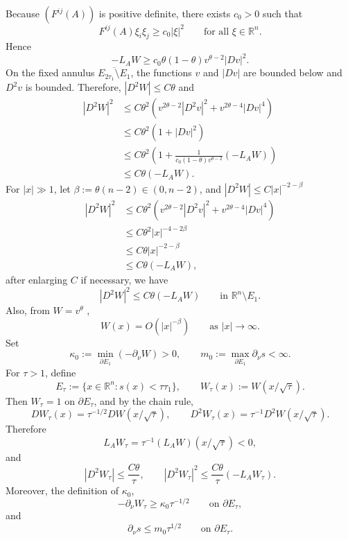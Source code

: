 \documentclass[reqno,a4paper]{amsart}
\numberwithin{equation}{section}
\begin{document}
	Because $(F^{ij}(A))$ is positive definite, there exists $c_0 > 0$ such that
	\[
	F^{ij}(A)\xi_i\xi_j \ge c_0|\xi|^2 \qquad \text{for all } \xi \in \mathbb{R}^n.
	\]
	Hence
	\begin{equation}
		-L_A W \ge c_0 \theta(1-\theta) v^{\theta-2} |Dv|^2. 
	\end{equation}
	On the fixed annulus $\overline{E_{2\tau_1}\setminus E_1}$, the functions $v$ and $|Dv|$ are bounded below and $D^2 v$ is bounded. Therefore, $|D^2 W| \le C\theta$ and 
	\begin{align*}
		|D^2W|^2 
		&\le C\theta^2\left( v^{2\theta-2}|D^2v|^2 + v^{2\theta-4}|Dv|^4 \right) \\
		&\le C\theta^2(1 + |Dv|^2)  \\
		&\le C\theta^2\left(1 + \frac{1}{c_0(1-\theta)v^{\theta-2}}(-L_AW)\right) \\
		&\le C\theta(-L_AW) . 
	\end{align*}
	For $|x| \gg 1$, let $\beta := \theta(n-2) \in (0, n-2)$, and $|D^2 W| \le C |x|^{-2-\beta}$
	\begin{align*}
		|D^2W|^2 
		&\le C\theta^2\left( v^{2\theta-2}|D^2v|^2 + v^{2\theta-4}|Dv|^4 \right)\\
		&\le C\theta^2 |x|^{-4-2\beta} \\
		&\le C\theta |x|^{-2-\beta}  \\
		&\le C\theta(-L_AW) ,
	\end{align*}
	after enlarging $C$ if necessary, we have
	\begin{equation}
		|D^2 W|^2 \le C\theta (-L_A W) \qquad \text{in } \mathbb{R}^n \setminus E_1.
	\end{equation}
	Also, from $W=v^\theta$ ,
	\begin{equation}
		W(x) = O(|x|^{-\beta}) \qquad \text{as } |x| \to \infty. 
	\end{equation}
	Set
	\begin{equation}
		\kappa_0 := \min_{\partial E_1} (-\partial_\nu W) > 0, \qquad m_0 := \max_{\partial E_1} \partial_\nu s < \infty. 
	\end{equation}
	For $\tau > 1$, define
	\[
	E_\tau := \{x \in \mathbb{R}^n : s(x) < \tau \tau_1\}, \qquad W_\tau(x) := W(x/\sqrt{\tau}).
	\]
	Then $W_\tau = 1$ on $\partial E_\tau$, and by the chain rule,
	\[
	DW_\tau(x) = \tau^{-1/2} DW(x/\sqrt{\tau}), \qquad
	D^2 W_\tau(x) = \tau^{-1} D^2 W(x/\sqrt{\tau}).
	\]
	Therefore
	\begin{equation}
		L_A W_\tau = \tau^{-1} (L_A W)(x/\sqrt{\tau}) < 0, 
	\end{equation}
	and 
	\[
	|D^2 W_\tau| \le \frac{C\theta}{\tau},\qquad |D^2 W_\tau|^2 \le \frac{C\theta}{\tau} (-L_A W_\tau). 
	\]
	Moreover, the definition of $\kappa_0$,
	\begin{equation}
		-\partial_\nu W_\tau \ge \kappa_0 \tau^{-1/2} \qquad \text{on } \partial E_\tau,
	\end{equation}
	and
	\begin{equation}
		\partial_\nu s \le m_0 \tau^{1/2} \qquad \text{on } \partial E_\tau. 
	\end{equation}
	
\end{document}
